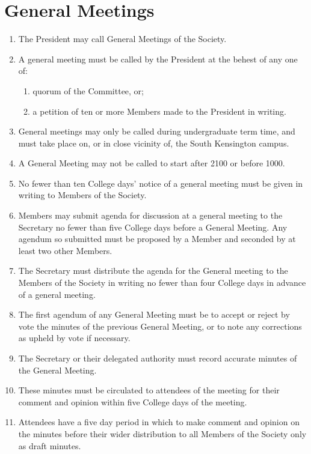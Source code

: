 \documentclass[a4paper]{tufte-handout}
\newcommand{\policyOffset}{12pt}
\newcommand{\policyCspp}[2][\policyOffset]{\marginnote[#1]{\textsc{CSP Policy \S#2}}}
\begin{document}
\section{General Meetings}
\begin{enumerate}[resume]
    \item The President may call General Meetings of the Society.
    \item \policyCspp{74} A general meeting must be called by the President at the behest of any one of:
        \begin{enumerate}
            \item quorum of the Committee, or;
            \item a petition of ten or more Members made to the President in writing.
        \end{enumerate}
    \item General meetings may only be called during undergraduate term time, and must take place on, or in close vicinity of, the South Kensington campus.
    \item A General Meeting may not be called to start after 2100 or before 1000.
    \item No fewer than ten College days' notice of a general meeting must be given in writing to Members of the Society.
    \item Members may submit agenda for discussion at a general meeting to the Secretary no fewer than five College days before a General Meeting. Any agendum so submitted must be proposed by a Member and seconded by at least two other Members.
    \item The Secretary must distribute the agenda for the General meeting to the Members of the Society in writing no fewer than four College days in advance of a general meeting.
    \item The first agendum of any General Meeting must be to accept or reject by vote the minutes of the previous General Meeting, or to note any corrections as upheld by vote if necessary.
    \item The Secretary or their delegated authority must record accurate minutes of the General Meeting.
    \item These minutes must be circulated to attendees of the meeting for their comment and opinion within five College days of the meeting.
    \item Attendees have a five day period in which to make comment and opinion on the minutes before their wider distribution to all Members of the Society only as draft minutes.

\end{enumerate}
\end{document}
